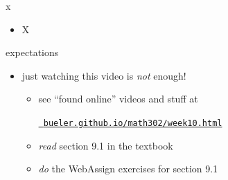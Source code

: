 \documentclass[urlcolor=blue,dvipsnames]{beamer}
\begin{document}
\begin{frame}{x}

\begin{itemize}
\item X
\end{itemize}
\end{frame}


\begin{frame}{expectations}

\begin{itemize}
\item just watching this video is \emph{not} enough!
     \begin{itemize}
     \item see ``found online'' videos and stuff at

     \centerline{\href{https://bueler.github.io/math302/week10.html}{\tt \color{cyan} bueler.github.io/math302/week10.html}}
     \item \emph{read} section 9.1 in the textbook
     \item \emph{do} the WebAssign exercises for section 9.1
     \end{itemize}
\end{itemize}
\end{frame}
\end{document}

